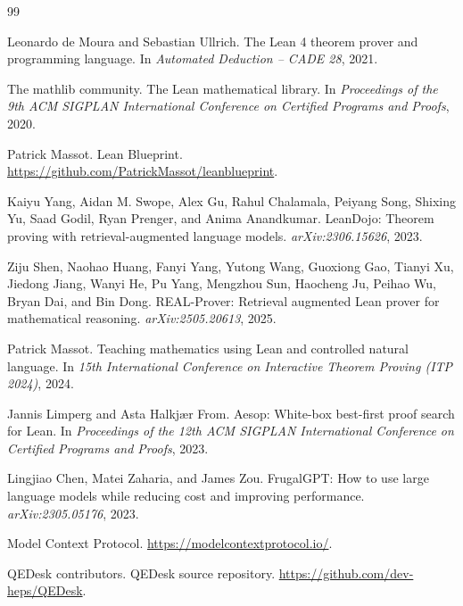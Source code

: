 \documentclass[11pt]{article}
\begin{document}
\begin{thebibliography}{99}

Leonardo de Moura and Sebastian Ullrich.
\newblock The Lean 4 theorem prover and programming language.
\newblock In \emph{Automated Deduction -- CADE 28}, 2021.

The mathlib community.
\newblock The Lean mathematical library.
\newblock In \emph{Proceedings of the 9th ACM SIGPLAN International
Conference on Certified Programs and Proofs}, 2020.

Patrick Massot.
\newblock Lean Blueprint.
\newblock \url{https://github.com/PatrickMassot/leanblueprint}.

Kaiyu Yang, Aidan M. Swope, Alex Gu, Rahul Chalamala, Peiyang Song,
Shixing Yu, Saad Godil, Ryan Prenger, and Anima Anandkumar.
\newblock LeanDojo: Theorem proving with retrieval-augmented language models.
\newblock \emph{arXiv:2306.15626}, 2023.

Ziju Shen, Naohao Huang, Fanyi Yang, Yutong Wang, Guoxiong Gao, Tianyi Xu,
Jiedong Jiang, Wanyi He, Pu Yang, Mengzhou Sun, Haocheng Ju, Peihao Wu,
Bryan Dai, and Bin Dong.
\newblock REAL-Prover: Retrieval augmented Lean prover for mathematical
reasoning.
\newblock \emph{arXiv:2505.20613}, 2025.

Patrick Massot.
\newblock Teaching mathematics using Lean and controlled natural language.
\newblock In \emph{15th International Conference on Interactive Theorem
Proving (ITP 2024)}, 2024.

Jannis Limperg and Asta Halkj{\ae}r From.
\newblock Aesop: White-box best-first proof search for Lean.
\newblock In \emph{Proceedings of the 12th ACM SIGPLAN International
Conference on Certified Programs and Proofs}, 2023.

Lingjiao Chen, Matei Zaharia, and James Zou.
\newblock FrugalGPT: How to use large language models while reducing cost and
improving performance.
\newblock \emph{arXiv:2305.05176}, 2023.

Model Context Protocol.
\newblock \url{https://modelcontextprotocol.io/}.

QEDesk contributors.
\newblock QEDesk source repository.
\newblock \url{https://github.com/dev-heps/QEDesk}.

\end{thebibliography}
\end{document}

